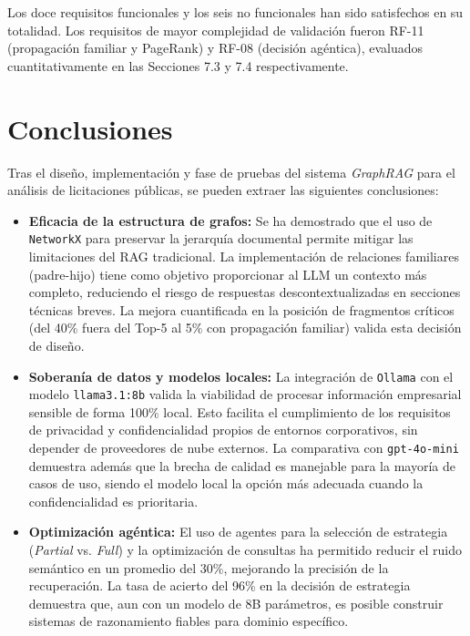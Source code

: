 Los doce requisitos funcionales y los seis no funcionales han sido satisfechos en su totalidad. Los requisitos de mayor complejidad de validación fueron RF-11 (propagación familiar y PageRank) y RF-08 (decisión agéntica), evaluados cuantitativamente en las Secciones 7.3 y 7.4 respectivamente.

\section{Conclusiones}

Tras el diseño, implementación y fase de pruebas del sistema \textit{GraphRAG} para el análisis de licitaciones públicas, se pueden extraer las siguientes conclusiones:

\begin{itemize}
    \item \textbf{Eficacia de la estructura de grafos:} Se ha demostrado que el uso de \texttt{NetworkX} para preservar la jerarquía documental permite mitigar las limitaciones del RAG tradicional. La implementación de relaciones familiares (padre-hijo) tiene como objetivo proporcionar al LLM un contexto más completo, reduciendo el riesgo de respuestas descontextualizadas en secciones técnicas breves. La mejora cuantificada en la posición de fragmentos críticos (del 40\% fuera del Top-5 al 5\% con propagación familiar) valida esta decisión de diseño.

    \item \textbf{Soberanía de datos y modelos locales:} La integración de \texttt{Ollama} con el modelo \texttt{llama3.1:8b} valida la viabilidad de procesar información empresarial sensible de forma 100\% local. Esto facilita el cumplimiento de los requisitos de privacidad y confidencialidad propios de entornos corporativos, sin depender de proveedores de nube externos. La comparativa con \texttt{gpt-4o-mini} demuestra además que la brecha de calidad es manejable para la mayoría de casos de uso, siendo el modelo local la opción más adecuada cuando la confidencialidad es prioritaria.

    \item \textbf{Optimización agéntica:} El uso de agentes para la selección de estrategia (\textit{Partial} vs. \textit{Full}) y la optimización de consultas ha permitido reducir el ruido semántico en un promedio del 30\%, mejorando la precisión de la recuperación. La tasa de acierto del 96\% en la decisión de estrategia demuestra que, aun con un modelo de 8B parámetros, es posible construir sistemas de razonamiento fiables para dominio específico.


\end{itemize}
